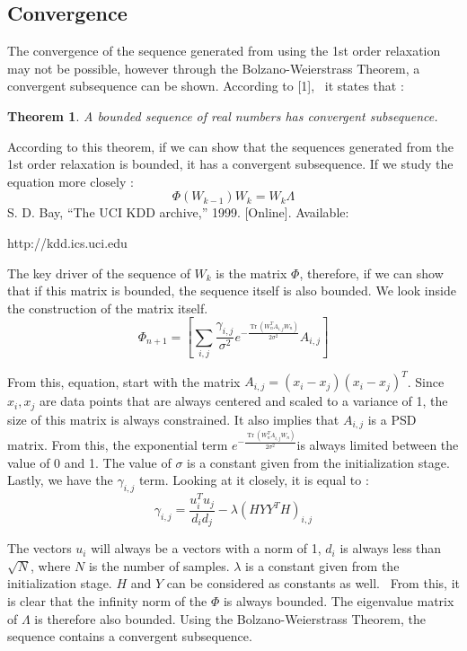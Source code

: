 \documentclass{article}
\newcommand{\tmop}[1]{\ensuremath{\operatorname{#1}}}
\newtheorem{theorem}{Theorem}
\begin{document}
\subsection{Convergence}



The convergence of the sequence generated from using the 1st order relaxation
may not be possible, however through the Bolzano-Weierstrass Theorem, a
convergent subsequence can be shown. According to [1], \ it states that :

\begin{theorem}
  A bounded sequence of real numbers has convergent subsequence.
\end{theorem}

According to this theorem, if we can show that the sequences generated from
the 1st order relaxation is bounded, it has a convergent subsequence. If we
study the equation more closely :
\[ \Phi ( W_{k - 1}) W_k = W_k \Lambda \]
S. D. Bay, {\textquotedblleft}The UCI KDD archive,'' 1999. [Online].
Available:



http://kdd.ics.uci.edu



The key driver of the sequence of $W_k$ is the matrix $\Phi$, therefore, if we
can show that if this matrix is bounded, the sequence itself is also bounded.
We look inside the construction of the matrix itself.
\[ \Phi_{n + 1} = \left[ \sum_{i, j} \frac{\gamma_{i, j}}{\sigma^2} e^{-
   \frac{\tmop{Tr} (W_n^T A_{i, j} W_n)}{2 \sigma^2}} A_{i, j} \right] \]


From this, equation, start with the matrix $A_{i, j} = ( x_i - x_j) ( x_i -
x_j)^T$. Since $x_i, x_j$ are data points that are always centered and scaled
to a variance of 1, the size of this matrix is always constrained. It also
implies that $A_{i, j}$ is a PSD matrix. From this, the exponential term $e^{-
\frac{\tmop{Tr} (W_n^T A_{i, j} W_n)}{2 \sigma^2}} $is always limited between
the value of 0 and 1. The value of $\sigma$ is a constant given from the
initialization stage. Lastly, we have the $\gamma_{i, j}$ term. Looking at it
closely, it is equal to :
\[ \gamma_{i, j} = \frac{u_i^T u_j}{d_i d_j} - \lambda ( H Y Y^T H)_{i, j} \]


The vectors $u_i$ will always be a vectors with a norm of 1, $d_i$ is always
less than $\sqrt{N}$, where $N$ is the number of samples. $\lambda$ is a
constant given from the initialization stage. $H$ and $Y$ can be considered as
constants as well. \ From this, it is clear that the infinity norm of the
$\Phi$ is always bounded. The eigenvalue matrix of $\Lambda$ is therefore also
bounded. Using the Bolzano-Weierstrass Theorem, the sequence contains a
convergent subsequence.
\end{document}
